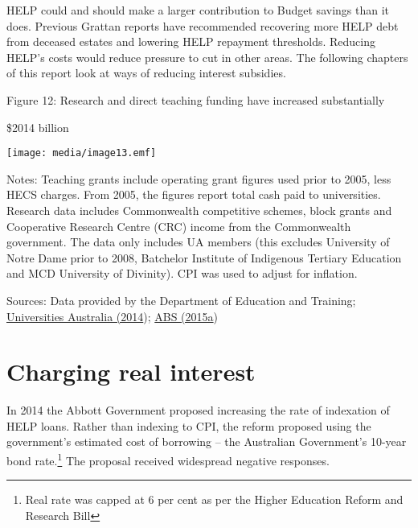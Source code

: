 \documentclass[]{book}
\begin{document}
HELP could and should make a larger contribution to Budget savings than it does. Previous Grattan reports have recommended recovering more HELP debt from deceased estates and lowering HELP repayment thresholds. Reducing HELP's costs would reduce pressure to cut in other areas. The following chapters of this report look at ways of reducing interest subsidies.

\protect\hypertarget{_Ref321411793}{}{}Figure 12: Research and direct teaching funding have increased substantially

\$2014 billion

\texttt{[image: media/image13.emf]}

Notes: Teaching grants include operating grant figures used prior to 2005, less HECS charges. From 2005, the figures report total cash paid to universities. Research data includes Commonwealth competitive schemes, block grants and Cooperative Research Centre (CRC) income from the Commonwealth government. The data only includes UA members (this excludes University of Notre Dame prior to 2008, Batchelor Institute of Indigenous Tertiary Education and MCD University of Divinity). CPI was used to adjust for inflation.

Sources: Data provided by the Department of Education and Training; \protect\hyperlink{_ENREF_78}{Universities Australia (2014}); \protect\hyperlink{_ENREF_2}{ABS (2015a})

\chapter{\texorpdfstring{\protect\hypertarget{_Ref333241617}{}{\protect\hypertarget{_Ref311118862}{}{}}}{}}\label{section-1}

\chapter{\texorpdfstring{\protect\hypertarget{_Ref463436889}{}{\protect\hypertarget{_Toc341784484}{}{}}Charging real interest}{Charging real interest}}\label{charging-real-interest}

In 2014 the Abbott Government proposed increasing the rate of indexation of HELP loans. Rather than indexing to CPI, the reform proposed using the government's estimated cost of borrowing -- the Australian Government's 10-year bond rate.\footnote{Real rate was capped at 6 per cent as per the Higher Education Reform and Research Bill} The proposal received widespread negative responses.
\end{document}
